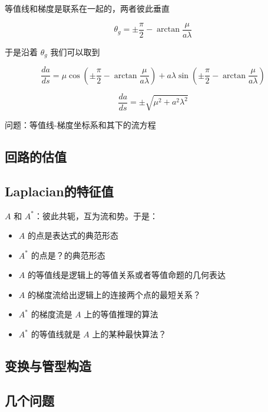 \documentclass[a4paper,12pt]{article}
\numberwithin{definition}{section}
\numberwithin{lemma}{section}
\numberwithin{proposition}{section}
\numberwithin{theorem}{section}
\numberwithin{grammar}{section}
\numberwithin{program}{section}
\numberwithin{convention}{section}
\numberwithin{corollary}{section}
\begin{document}
等值线和梯度是联系在一起的，两者彼此垂直

\begin{equation}
    \theta_g = \pm \frac{\pi}{2} - \arctan \frac{\mu}{a \lambda}
\end{equation}

于是沿着 $\theta_g$ 我们可以取到

\begin{equation}
    \frac{da}{ds} = \mu \cos (\pm \frac{\pi}{2} - \arctan \frac{\mu}{a \lambda}) + a \lambda \sin (\pm \frac{\pi}{2} - \arctan \frac{\mu}{a \lambda})
\end{equation}

\begin{equation}
    \frac{da}{ds} = \pm \sqrt {\mu^2 + a^2 \lambda^2}
\end{equation}

问题：等值线-梯度坐标系和其下的流方程


\subsection{回路的估值}

\subsection{Laplacian的特征值}


$A$ 和 $A^*$：彼此共轭，互为流和势。于是：

\begin{itemize}
    \item $A$ 的点是表达式的典范形态
    \item $A^*$ 的点是？的典范形态
    \item $A$ 的等值线是逻辑上的等值关系或者等值命题的几何表达
    \item $A$ 的梯度流给出逻辑上的连接两个点的最短关系？
    \item $A^*$ 的梯度流是 $A$ 上的等值推理的算法
    \item $A^*$ 的等值线就是 $A$ 上的某种最快算法？
\end{itemize}

\subsection{变换与管型构造}

\subsection{几个问题}
\end{document}
